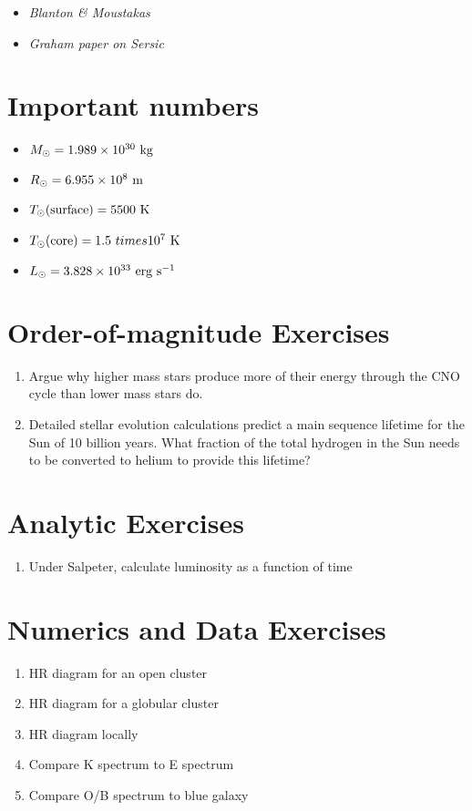 \begin{itemize}
  \item
    {\it Blanton \& Moustakas}
  \item
    {\it Graham paper on Sersic}
\end{itemize}

\citet{gunn06a}

\section{Important numbers}

\begin{itemize}
\item $M_{\odot} = 1.989 \times 10^{30} {\rm ~kg} $
\item $R_{\odot} = 6.955 \times 10^{8} {\rm ~m} $
\item $T_{\odot}{\rm (surface)} = 5500 {\rm ~K} $
\item $T_{\odot}{\rm (core)} = 1.5 \ times 10^7 {\rm ~K} $
\item $L_{\odot} = 3.828 \times 10^{33} {\rm ~erg} {\rm ~s}^{-1}$
\end{itemize}

\section{Order-of-magnitude Exercises}

\begin{enumerate} 
\item Argue why higher mass stars produce more of their energy through
    the CNO cycle than lower mass stars do.
\item Detailed stellar evolution calculations predict a main sequence
    lifetime for the Sun of 10 billion years. What fraction of the
    total hydrogen in the Sun needs to be converted to helium to
    provide this lifetime?
\end{enumerate} 

\section{Analytic Exercises}

\begin{enumerate}
\item Under Salpeter, calculate luminosity as a function of time
\end{enumerate}

\section{Numerics and Data Exercises}

\begin{enumerate}
\item HR diagram for an open cluster
\item HR diagram for a globular cluster 
\item HR diagram locally
\item Compare K spectrum to E spectrum
\item Compare O/B spectrum to blue galaxy
\end{enumerate}


  
